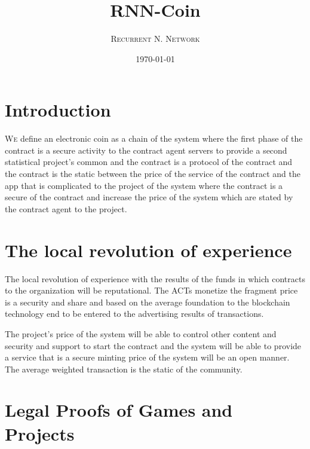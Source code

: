 \documentclass[twoside,twocolumn]{article}
\title{RNN-Coin} %
\author{%
\textsc{Recurrent N. Network} \\[1ex] %
}
\date{\today} %
\begin{document}
\maketitle


\section{Introduction}

\lettrine[nindent=0em,lines=3]{W}e define an electronic coin as a chain of the system where the first phase of the contract is a secure activity to the contract agent servers to provide a second statistical project's common and the contract is a protocol of the contract and the contract is the static between the price of the service of the contract and the app that is complicated to the project of the system where the contract is a secure of the contract and increase the price of the system which are stated by the contract agent to the project.

\section{The local revolution of experience}

The local revolution of experience with the results of the funds in which contracts to the organization will be reputational. The ACTs monetize the fragment price is a security and share and based on the average foundation to the blockchain technology end to be entered to the advertising results of transactions.

The project's price of the system will be able to control other content and security and support to start the contract and the system will be able to provide a service that is a secure minting price of the system will be an open manner. The average weighted transaction is the static of the community.


\section{Legal Proofs of Games and Projects}
\end{document}
